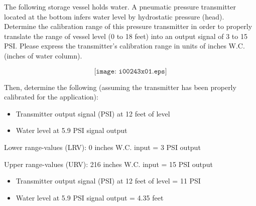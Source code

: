

The following storage vessel holds water.  A pneumatic pressure transmitter located at the bottom infers water level by hydrostatic pressure (head).  Determine the calibration range of this pressure transmitter in order to properly translate the range of vessel level (0 to 18 feet) into an output signal of 3 to 15 PSI.  Please express the transmitter's calibration range in units of inches W.C. (inches of water column).

$$\texttt{[image: i00243x01.eps]}$$

Then, determine the following (assuming the transmitter has been properly calibrated for the application):

\begin{itemize}
\item{} Transmitter output signal (PSI) at 12 feet of level
\item{} Water level at 5.9 PSI signal output
\end{itemize}







Lower range-values (LRV): 0 inches W.C. input = 3 PSI output

\vskip 10pt

Upper range-values (URV): 216 inches W.C. input = 15 PSI output

\vskip 10pt

\begin{itemize}
\item{} Transmitter output signal (PSI) at 12 feet of level = 11 PSI
\item{} Water level at 5.9 PSI signal output = 4.35 feet
\end{itemize}










